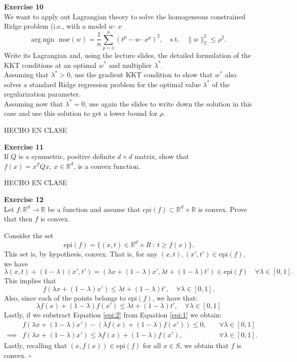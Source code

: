 \documentclass[11pt,table]{article}
\newcommand{\qed}{\hfill $\square$}
\newenvironment{problem}[2][Exercise]
    { \begin{mdframed}[backgroundcolor=gray!20] \textbf{#1 #2} \\}
    {  \end{mdframed}}
\newcommand\norm[1]{\lVert#1\rVert}
\newcommand\R{\mathbb R}
\begin{document}
\begin{problem}{10}
We want to apply out Lagrangian theory to solve the homogeneous constrained Ridge problem (i.e., with a model \(w\cdot x\)
\[
\text{arg}\min_{w} \text{ mse}(w) = \frac{1}{n} \sum_{p=1}^n (t^p - w \cdot x^p)^2, \quad \text{s.t.} \quad \norm{w}_2^2 \leq \rho^2.  
\]
Write its Lagrangian and, using the lecture slides, the detailed formulation of the KKT conditions at an optimal \(w^*\) and multiplier \(\lambda^*\).\\
Assuming that \(\lambda^* > 0\), use the gradient KKT condition to show that \(w^*\) also solves a standard Ridge regression problem for the optimal value \(\lambda^*\) of the regularization parameter.\\
Assuming now that \(\lambda^* = 0\), use again the slides to write down the solution in this case and use this solution to get a lower bound for \(\rho\).
\end{problem}

HECHO EN CLASE

\begin{problem}{11}
  If \( Q \) is a symmetric, positive definite \( d \times d \) matrix, show that \( f(x) = x^TQx, \ x \in \mathbb{R}^d \), is a convex function.
\end{problem}

HECHO EN CLASE

\begin{problem}{12}
  Let \( f:\mathbb{R}^d \to \mathbb{R} \)  be a function and assume that \( epi(f) \subset \mathbb{R}^d \times \mathbb{R} \)  is convex. Prove that then \( f \)  is convex.

\end{problem}

Consider the set
\[
\text{epi}(f) = \{(x,t)\in \R^d \times R \ : \ t \geq f(x)\}.  
\]
This set is, by hypothesis, convex. That is, for any \((x,t),(x',t') \in \text{epi}(f)\), we have
\[
\lambda(x,t) + (1-\lambda)(x',t')  = \left(\lambda x + (1-\lambda)x', \lambda t + (1-\lambda)t'\right) \in \text{epi}(f)\quad \forall \lambda \in [0,1]. 
\]
This implies that
\begin{equation}\label{epi:1}
f(\lambda x + (1-\lambda)x') \leq \lambda t + (1-\lambda)t', \quad \forall \lambda \in [0,1].
\end{equation}
Also, since each of the points belongs to \(\text{epi}(f)\), we have that:
\begin{equation}\label{epi:2}
\lambda f(x) + (1-\lambda)f(x') \leq \lambda t + (1-\lambda)t', \quad \forall \lambda \in [0,1]  
\end{equation}
Lastly, if we substract Equation \eqref{epi:2} from Equation \eqref{epi:1} we obtain:
\begin{align*}
&f(\lambda x + (1-\lambda)x')  - \left( \lambda f(x) + (1-\lambda)f(x')\right)  \leq 0, &\quad \forall \lambda \in [0,1]
\\ \implies & f(\lambda x + (1-\lambda)x') \leq  \lambda f(x) + (1-\lambda)f(x'), &\quad \forall \lambda \in [0,1].
\end{align*}
Lastly, recalling that \((x,f(x)) \in \text{epi}(f)\) for all \(x \in S\), we obtain that \(f\) is convex. \qed \\
\end{document}
